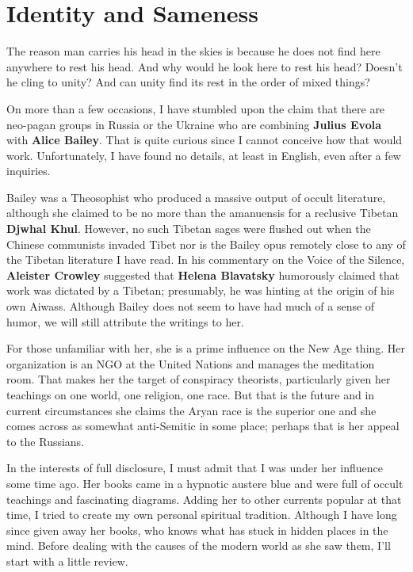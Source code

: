 \section{Identity and Sameness}

\begin{quotex}
The reason man carries his head in the skies is because he does not find here anywhere to rest his head. And why would he look here to rest his head? Doesn't he cling to unity? And can unity find its rest in the order of mixed things?
\end{quotex}


On more than a few occasions, I have stumbled upon the claim that there are neo-pagan groups in Russia or the Ukraine who are combining \textbf{Julius Evola} with \textbf{Alice Bailey}. That is quite curious since I cannot conceive how that would work. Unfortunately, I have found no details, at least in English, even after a few inquiries.

Bailey was a Theosophist who produced a massive output of occult literature, although she claimed to be no more than the amanuensis for a reclusive Tibetan \textbf{Djwhal Khul}. However, no such Tibetan sages were flushed out when the Chinese communists invaded Tibet nor is the Bailey opus remotely close to any of the Tibetan literature I have read. In his commentary on the Voice of the Silence, \textbf{Aleister Crowley} suggested that \textbf{Helena Blavatsky} humorously claimed that work was dictated by a Tibetan; presumably, he was hinting at the origin of his own Aiwass. Although Bailey does not seem to have had much of a sense of humor, we will still attribute the writings to her.

For those unfamiliar with her, she is a prime influence on the New Age thing. Her organization is an NGO at the United Nations and manages the meditation room. That makes her the target of conspiracy theorists, particularly given her teachings on one world, one religion, one race. But that is the future and in current circumstances she claims the Aryan race is the superior one and she comes across as somewhat anti-Semitic in some place; perhaps that is her appeal to the Russians.

In the interests of full disclosure, I must admit that I was under her influence some time ago. Her books came in a hypnotic austere blue and were full of occult teachings and fascinating diagrams. Adding her to other currents popular at that time, I tried to create my own personal spiritual tradition. Although I have long since given away her books, who knows what has stuck in hidden places in the mind. Before dealing with the causes of the modern world as she saw them, I'll start with a little review.

